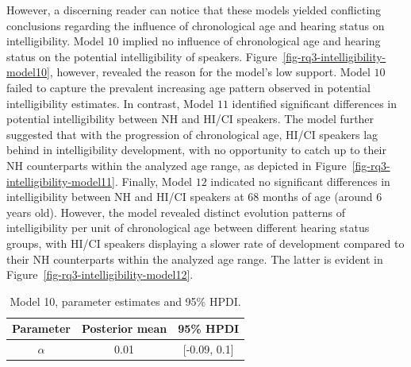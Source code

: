 \documentclass[
  authoryear,
  preprint,
  1p]{elsarticle}
\begin{document}
However, a discerning reader can notice that these models yielded
conflicting conclusions regarding the influence of chronological age and
hearing status on intelligibility. Model \(10\) implied no influence of
chronological age and hearing status on the potential intelligibility of
speakers. Figure~\ref{fig-rq3-intelligibility-model10}, however,
revealed the reason for the model's low support. Model \(10\) failed to
capture the prevalent increasing age pattern observed in potential
intelligibility estimates. In contrast, Model \(11\) identified
significant differences in potential intelligibility between NH and
HI/CI speakers. The model further suggested that with the progression of
chronological age, HI/CI speakers lag behind in intelligibility
development, with no opportunity to catch up to their NH counterparts
within the analyzed age range, as depicted in
Figure~\ref{fig-rq3-intelligibility-model11}. Finally, Model \(12\)
indicated no significant differences in intelligibility between NH and
HI/CI speakers at \(68\) months of age (around \(6\) years old).
However, the model revealed distinct evolution patterns of
intelligibility per unit of chronological age between different hearing
status groups, with HI/CI speakers displaying a slower rate of
development compared to their NH counterparts within the analyzed age
range. The latter is evident in
Figure~\ref{fig-rq3-intelligibility-model12}.

\begin{longtable}[]{@{}ccc@{}}

\caption{\label{tbl-parameter-model10}Model 10, parameter estimates and
95\% HPDI.}

\tabularnewline

\toprule\noalign{}
Parameter & Posterior mean & 95\% HPDI \\
\midrule\noalign{}
\endhead
\bottomrule\noalign{}
\endlastfoot
\(\alpha\) & 0.01 & {[}-0.09, 0.1{]} \\

\end{longtable}
\end{document}
